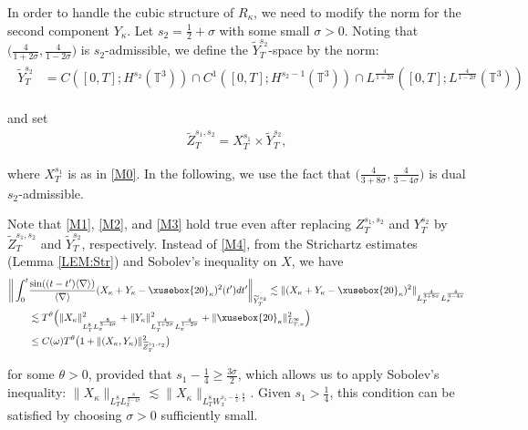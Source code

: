 \documentclass[%
11pt,  reqno]{amsart}
\def\<#1>{\xusebox{#1}}
\newcommand{\1}{\hspace{0.2mm}\text{I}\hspace{0.2mm}}
\newcommand{\noi}{\noindent}
\newcommand{\T}{\mathbb{T}}
\newcommand{\nb}{\nabla}
\newcommand{\kk}{\kappa}
\newcommand{\s}{\sigma}
\newcommand{\wt}{\widetilde}
\newcommand{\ta}{\theta}
\renewcommand{\o}{\omega}
\newcommand{\les}{\lesssim}
\newcommand{\jb}[1]
{\langle #1 \rangle}
\numberwithin{equation}{section}
\numberwithin{theorem}{section}
\begin{document}
\noi
In order to handle the cubic structure of $R_\kk$, 
we need to modify the norm for the second component $Y_\kk$.
Let  $s_2 = \frac 12 + \s$
with some small $\s > 0$.
Noting that 
$\big(\frac{4}{1+2\s}, \frac{4}{1-2\s}\big)$
is $s_2$-admissible,
we define the $\wt Y^{s_2}_T$-space
by the norm:
\begin{align*}
\begin{split}
 \wt Y^{s_2}_T 
 & = C([0,T];H^{s_2}(\T^3))\cap C^1([0,T]; H^{s_2-1}(\T^3))
 \cap L^{\frac{4}{1+2\s}}([0, T]; L^{\frac{4}{1-2\s}}(\T^3))
\end{split}
\end{align*}

\noi
and set 
\begin{align*}
\wt Z^{s_1, s_2}_T =  X^{s_1}_T\times  \wt Y^{s_2}_T,
\end{align*}

\noi
where $X^{s_1}_T$ is as in \eqref{M0}.
In the following, we use the fact that 
$\big(\frac{4}{3+8\s}, \frac{4}{3-4\s}\big)$
is dual $s_2$-admissible.


Note that \eqref{M1}, \eqref{M2}, and \eqref{M3}
hold 
true even after replacing 
$Z^{s_1, s_2}_T$ and  $Y^{s_2}_T$
by $\wt Z^{s_1, s_2}_T$ and $\wt Y^{s_2}_T$, respectively.
Instead of \eqref{M4}, 
from the Strichartz estimates (Lemma \ref{LEM:Str})
and Sobolev's inequality on $X$, 
we have
\begin{align}
\bigg\| \int_0^t &  \frac{\sin((t-t')\jb{\nb})}{\jb{\nb}} 
 (X_\kk+Y_\kk-\<20>_\kk)^2(t') dt'\bigg\|_{\wt Y^{s_2}_T}
 \les \| (X_\kk+Y_\kk-\<20>_\kk)^2\|_{L^\frac{4}{3+8\s}_{T} L^\frac{4}{3-4\s}_x}\notag\\
& \les T^\ta 
\Big(\| X_\kk\|_{L^8_T L^\frac{8}{3-4\s}_x}^2
+ \| Y_\kk\|_{L^\frac{4}{1+2\s}_T L^\frac{4}{1-2\s}_x}^2
+ \| \<20>_\kk\|_{L^\infty_{T, x}}^2\Big)\notag\\
& \le C(\o) T^\ta \big( 1 + \|(X_\kk, Y_\kk)\|_{\wt Z^{s_1, s_2}_T}^2 \big)
\label{WU11}
\end{align}

\noi
for some $\ta > 0$, provided that $s_1 - \frac 1 4  \geq \frac{3\s}{2}$,
 which allows us to apply   Sobolev's inequality:
$
\|  X_\kk\|_{L^8_T L^\frac{8}{3-4\s}_x}  \les
\|  X_\kk\|_{L^8_T W^{s_1-\frac14, \frac83 }_x}
$.
Given $s_1 > \frac 14$, this condition can be satisfied by choosing $\s > 0$ sufficiently small.
\end{document}
